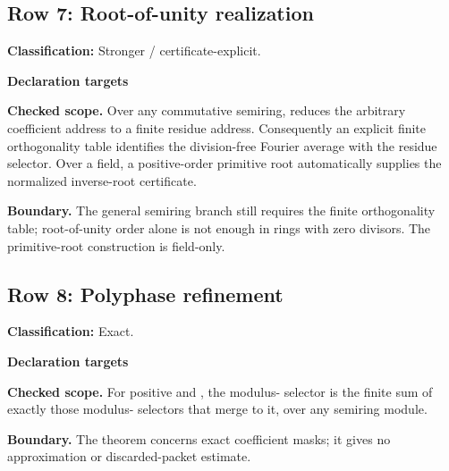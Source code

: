 \subsection{Row 7: Root-of-unity realization}
\label{row:7}
\textbf{Classification:} Stronger / certificate-explicit.
\par\smallskip\textbf{Declaration targets}\par
{\small\noindent{}\par}
{\small\noindent{}\par}
{\small\noindent{}\par}
{\small\noindent{}\par}
{\small\noindent{}\par}
{\small\noindent{}\par}
{\small\noindent{}\par}
{\small\noindent{}\par}
\smallskip\textbf{Checked scope.} Over any commutative semiring,  reduces the arbitrary coefficient address to a finite residue address. Consequently an explicit finite  orthogonality table identifies the division-free Fourier average with the residue selector. Over a field, a positive-order primitive root automatically supplies the normalized inverse-root certificate.
\par\smallskip\textbf{Boundary.} The general semiring branch still requires the finite orthogonality table; root-of-unity order alone is not enough in rings with zero divisors. The primitive-root construction is field-only.
\medskip
{}
\subsection{Row 8: Polyphase refinement}
\label{row:8}
\textbf{Classification:} Exact.
\par\smallskip\textbf{Declaration targets}\par
{\small\noindent{}\par}
\smallskip\textbf{Checked scope.} For positive  and , the modulus- selector is the finite sum of exactly those modulus- selectors that merge to it, over any semiring module.
\par\smallskip\textbf{Boundary.} The theorem concerns exact coefficient masks; it gives no approximation or discarded-packet estimate.
\medskip
{}
